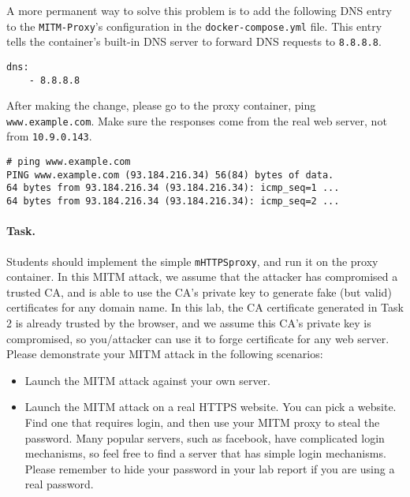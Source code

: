 A more permanent way to solve this problem is to add the following DNS 
entry to the \texttt{MITM-Proxy}'s configuration in 
the \texttt{docker-compose.yml} file. This entry tells the container's 
built-in DNS server to forward DNS requests to \texttt{8.8.8.8}. 

\begin{lstlisting}
dns:
    - 8.8.8.8
\end{lstlisting}
 
 
After making the change, please go to the proxy container,
ping \texttt{www.example.com}. Make sure
the responses come from the real web server, not from
\texttt{10.9.0.143}.  

\begin{lstlisting}
# ping www.example.com
PING www.example.com (93.184.216.34) 56(84) bytes of data.
64 bytes from 93.184.216.34 (93.184.216.34): icmp_seq=1 ...
64 bytes from 93.184.216.34 (93.184.216.34): icmp_seq=2 ...
\end{lstlisting}
 
 

\paragraph{Task.} Students should implement the simple \texttt{mHTTPSproxy},
and run it on the proxy container. 
In this MITM attack, we assume that the attacker has compromised a trusted CA, and is 
able to use the CA's private key to generate fake (but valid) certificates for any
domain name. In this lab, the CA certificate generated in Task 2
is already trusted by the browser, and we assume this CA's private key
is compromised, so you/attacker can use it to forge certificate for any web server. 
Please demonstrate your MITM attack in the following scenarios:


\begin{itemize}

\item Launch the MITM attack against your own server. 

\item Launch the MITM attack on a real HTTPS website. You can pick 
a website. Find one that requires login, and then use your MITM proxy to 
steal the password. Many popular servers, such as facebook, have complicated 
login mechanisms, so feel free to find a server that has simple login mechanisms. 
Please remember to hide your password in your lab report if you 
are using a real password. 
\end{itemize}



